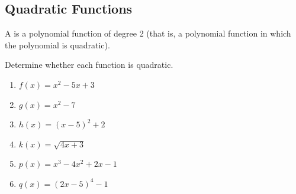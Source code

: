 \subsection{Quadratic Functions} 
\begin{definition}
A  is a polynomial function of degree 2 (that is, a polynomial function in which the polynomial is quadratic).
\end{definition}
\begin{Example}
Determine whether each function is quadratic.
\begin{enumerate}\setabc
\item $f(x)=x^2-5x+3$\makeblanknewf
\item $g(x)=x^2-7$\makeblanknewf
\item $h(x)=(x-5)^2+2$\makeblanknewf
\item $k(x)=\sqrt{4x+3}$\makeblanknewf
\item $p(x)=x^3-4x^2+2x-1$\makeblanknewf
\item $q(x)=(2x-5)^4-1$\makeblanknewf
\end{enumerate}
\end{Example}
